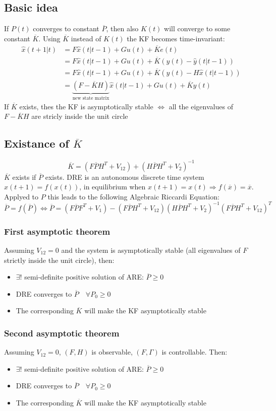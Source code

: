 \documentclass{article}
\begin{document}
\subsection{Basic idea}
If $P(t)$ converges to constant $\overline{P}$, then also $K(t)$ will converge to some constant $\overline{K}$. Using $\overline{K}$ instead of $K(t)$ the KF becomes time-invariant:
\begin{align*}
\hat{x}(t+1|t)&=F\hat{x}(t|t-1)+Gu(t)+\overline{K}e(t)\\
&=F\hat{x}(t|t-1)+Gu(t)+\overline{K}\left(y(t)-\hat{y}(t|t-1)\right)\\
&=F\hat{x}(t|t-1)+Gu(t)+\overline{K}\left(y(t)-H\hat{x}(t|t-1)\right)\\
&=\underbrace{
	\left(F-\overline{K}H\right)
}_{
	\text{new state matrix}
}\hat{x}(t|t-1)+Gu(t)+\overline{K}y(t)
\end{align*}
If $\overline{K}$ exists, thes the KF is asymptotically stable $\iff$ all the eigenvalues of $F-\overline{K}H$ are stricly inside the unit circle
\subsection{Existance of $\overline{K}$}
\[
\overline{K}=
\left(F\overline{P}H^T+V_{12}\right)
+
\left(H\overline{P}H^T+V_2\right)^{-1}
\]
$\overline{K}$ exists if $\overline{P}$ exists. DRE is an autonomous discrete time system $x(t+1)=f(x(t))$, in equilibrium when $x(t+1)=x(t) \Rightarrow f(\overline{x})=\overline{x}$. Applyed to $P$ this leads to the following Algebraic Riccardi Equation:
\[
\overline{P}=f(\overline{P}) \iff
\overline{P}=
\left(
F\overline{P}F^T+V_1
\right)-\left(
F\overline{P}H^T+V_{12}
\right)\left(
H\overline{P}H^T+V_2
\right)^{-1}\left(
F\overline{P}H^T+V_{12}
\right)^T
\]
\subsubsection{First asymptotic theorem}
Assuming $V_{12}=0$ and the system is asymptotically stable (all eigenvalues of $F$ strictly inside the unit circle), then:
\begin{itemize}
\item $\exists!$ semi-definite positive solution of ARE: $\overline{P}\geq 0$
\item DRE converges to $\overline{P}\quad\forall P_0\geq 0$
\item The corresponding $\overline{K}$ will make the KF asymptotically stable
\end{itemize}
\subsubsection{Second asymptotic theorem}
Assuming $V_{12}=0$, $(F,H)$ is observable, $(F,\Gamma)$ is controllable. Then:
\begin{itemize}
\item $\exists!$ semi-definite positive solution of ARE: $\overline{P}\geq 0$
\item DRE converges to $\overline{P}\quad\forall P_0\geq 0$
\item The corresponding $\overline{K}$ will make the KF asymptotically stable
\end{itemize}
\end{document}
